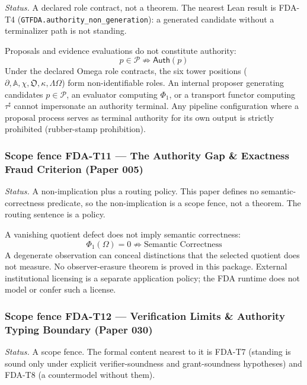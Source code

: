 \documentclass[
  11pt,
]{article}
\begin{document}
\emph{Status.} A declared role contract, not a theorem. The nearest Lean result is FDA-T4 (\nolinkurl{GTFDA.authority_non_generation}): a generated candidate without a terminalizer path is not standing.

Proposals and evidence evaluations do not constitute authority: \[\boxed{ p \in \mathcal{P} \not\Rightarrow \mathsf{Auth}(p) }\] Under the declared Omega role contracts, the six tower positions (\(\partial, \mathbb{A}, \chi, \mathfrak{O}, \kappa, \Lambda\Omega\)) form non-identifiable roles. An internal proposer generating candidates \(p \in \mathcal{P}\), an evaluator computing \(\Phi_1\), or a transport functor computing \(\tau^\sharp\) cannot impersonate an authority terminal. Any pipeline configuration where a proposal process serves as terminal authority for its own output is strictly prohibited (rubber-stamp prohibition).

\subsubsection{Scope fence FDA-T11 --- The Authority Gap \& Exactness Fraud Criterion (Paper 005)}\label{scope-fence-fda-t11-the-authority-gap-exactness-fraud-criterion-paper-005}

\emph{Status.} A non-implication plus a routing policy. This paper defines no semantic-correctness predicate, so the non-implication is a scope fence, not a theorem. The routing sentence is a policy.

A vanishing quotient defect does not imply semantic correctness: \[\Phi_1(\Omega) = 0 \not\Rightarrow \text{Semantic Correctness}\] A degenerate observation can conceal distinctions that the selected quotient does not measure. No observer-erasure theorem is proved in this package. External institutional licensing is a separate application policy; the FDA runtime does not model or confer such a license.

\subsubsection{Scope fence FDA-T12 --- Verification Limits \& Authority Typing Boundary (Paper 030)}\label{scope-fence-fda-t12-verification-limits-authority-typing-boundary-paper-030}

\emph{Status.} A scope fence. The formal content nearest to it is FDA-T7 (standing is sound only under explicit verifier-soundness and grant-soundness hypotheses) and FDA-T8 (a countermodel without them).
\end{document}

